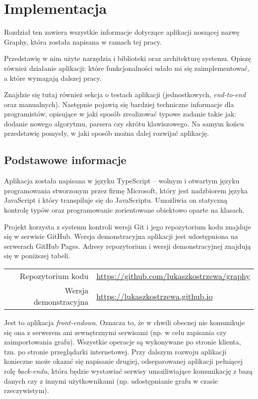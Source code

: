 \chapter{Implementacja}

Rozdział ten zawiera wszystkie informacje dotyczące aplikacji noszącej nazwę Graphy, która została napisana w ramach tej pracy. 

Przedstawię w nim użyte narzędzia i biblioteki oraz architekturę systemu. Opiszę również działanie aplikacji: które funkcjonalności udało mi się zaimplementować, a które wymagają dalszej pracy. 

Znajdzie się tutaj również sekcja o testach aplikacji (jednostkowych, \textit{end-to-end} oraz manualnych). Następnie pojawią się bardziej techniczne informacje dla programistów, opisujące w jaki sposób zrealizować typowe zadanie takie jak: dodanie nowego algorytmu, parsera czy skrótu klawiszowego. Na samym końcu przedstawię pomysły, w jaki sposób można dalej rozwijać aplikację.

\section{Podstawowe informacje}

Aplikacja została napisana w języku TypeScript -- wolnym i otwartym języku programowania stworzonym przez firmę Microsoft, który jest nadzbiorem języka JavaScript i który transpiluje się do JavaScriptu. Umożliwia on statyczną kontrolę typów oraz programowanie zorientowane obiektowo oparte na klasach.

Projekt korzysta z systemu kontroli wersji Git i jego repozytorium kodu znajduje się w serwisie GitHub. Wersja demonstracyjna aplikacji jest udostępniona na serwerach GitHub Pages. Adresy repozytorium i wersji demonstracyjnej znajdują się w poniższej tabeli.

\bigskip
\noindent\begin{tabularx}{\textwidth}{r|X|}
\cline{2-2}
  Repozytorium kodu & \hyperref[https://github.com/lukaszkostrzewa/graphy]{https://github.com/lukaszkostrzewa/graphy} \\ 
\cline{2-2} 
 Wersja demonstracyjna & \hyperref[https://lukaszkostrzewa.github.io]{https://lukaszkostrzewa.github.io} \\ 
\cline{2-2}
\end{tabularx} 
\bigskip

Jest to aplikacja \textit{front-endowa}. Oznacza to, że w chwili obecnej nie komunikuje się ona z serwerem ani zewnętrznymi serwisami (np. w celu zapisania czy zaimportowania grafu). Wszystkie operacje są wykonywane po stronie klienta, tzn. po stronie przeglądarki internetowej. Przy dalszym rozwoju aplikacji konieczne może okazać się napisanie drugiej, odseparowanej aplikacji pełniącej rolę \textit{back-endu}, która będzie wystawiać serwisy umożliwiające komunikację z bazą danych czy z innymi użytkownikami (np. udostępnianie grafu w czasie rzeczywistym).

